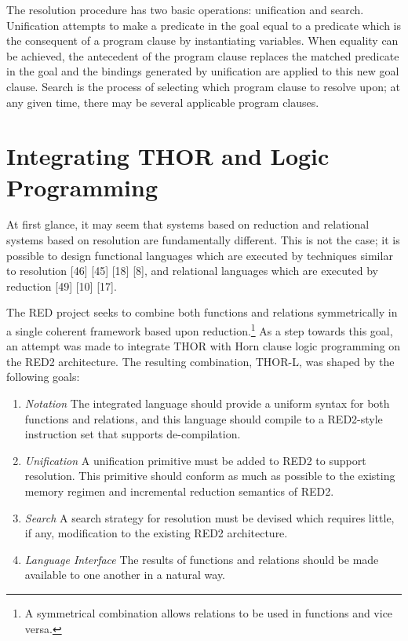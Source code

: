 The resolution procedure has two basic operations: unification and search.
Unification attempts to make a predicate in the goal equal to a predicate which
is the consequent of a program clause by instantiating variables. When equality
can be achieved, the antecedent of the program clause replaces the matched
predicate in the goal and the bindings generated by unification are applied to
this new goal clause. Search is the process of selecting which program clause to
resolve upon; at any given time, there may be several applicable program
clauses.

\section{Integrating THOR and Logic Programming}

At first glance, it may seem that \lambdacalculus{} systems based on reduction
and relational systems based on resolution are fundamentally different. This is
not the case; it is possible to design functional languages which are executed
by techniques similar to resolution [46] [45] [18] [8], and relational languages
which are executed by reduction [49] [10] [17].

The RED project seeks to combine both functions and relations symmetrically in a
single coherent framework based upon reduction.\footnote{A symmetrical
combination allows relations to be used in functions and vice versa.} As a step
towards this goal, an attempt was made to integrate THOR with Horn clause logic
programming on the RED2 architecture. The resulting combination, THOR-L, was
shaped by the following goals:

\begin{enumerate}
\item \emph{Notation} The integrated language should provide a uniform syntax
for both functions and relations, and this language should compile to a
RED2-style instruction set that supports de-compilation.
\item \emph{Unification} A unification primitive must be added to RED2 to
support resolution. This primitive should conform as much as possible to the
existing memory regimen and incremental reduction semantics of RED2.
\item \emph{Search} A search strategy for resolution must be devised which
requires little, if any, modification to the existing RED2 architecture.
\item \emph{Language Interface} The results of functions and relations should
be made available to one another in a natural way.
\end{enumerate}

